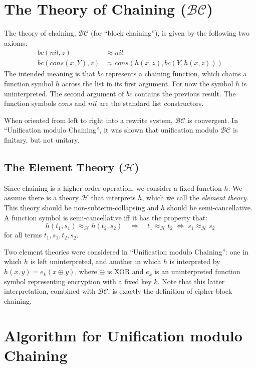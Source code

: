 \documentclass[11pt]{article}
\newcommand{\BC}{\mathcal{BC}}
\newcommand{\HH}{\mathcal{H}}
\newcommand{\Bc}{\mathit{bc}}
\newcommand{\Hh}{\mathit{h}}
\newcommand{\Cons}{\mathit{cons}}
\newcommand{\Nil}{\mathit{nil}}
\begin{document}
\section{The Theory of Chaining (\texorpdfstring{$\BC$}{BC})}
\label{section:theory}

The theory of chaining, $\BC$ (for ``block chaining''), is given by the
following two axioms:
\begin{align*}
    \Bc(\Nil, z) &\approx \Nil \\
    \Bc(\Cons(x, Y), z) &\approx \Cons(\Hh(x, z), \Bc(Y, \Hh(x, z)))
\end{align*}
The intended meaning is that $\Bc$ represents a chaining function, which chains
a function symbol $\Hh$ across the list in its first argument. For now the
symbol $\Hh$ is uninterpreted. The second argument of $\Bc$ contains the
previous result. The function symbols $\Cons$ and $\Nil$ are the standard list
constructors.

When oriented from left to right into a rewrite system, $\BC$ is convergent.
In ``Unification modulo Chaining'', it was shown that unification modulo $\BC$
is finitary, but not unitary.

\subsection{The Element Theory (\texorpdfstring{$\HH$}{H})}
\label{subsection:element-theory}

Since chaining is a higher-order operation, we consider a fixed function $\Hh$.
We assume there is a theory $\HH$ that interprets $\Hh$, which we call the
\emph{element theory}. This theory should be non-subterm-collapsing and
$\Hh$ should be semi-cancellative. A function symbol is semi-cancellative iff
it has the property that:
\[ \Hh(t_1, s_1) \approx_\HH^{} \Hh(t_2, s_2) \quad \Rightarrow \quad
t_1 \approx_\HH^{} t_2 \; \Leftrightarrow \; s_1 \approx_\HH^{} s_2 \]
for all terms $t_1, s_1, t_2, s_2$.

Two element theories were considered in ``Unification modulo Chaining'': one in
which $\Hh$ is left uninterpreted, and another in which $\Hh$ is interpreted by
$\Hh(x, y) = e_k(x \oplus y)$, where $\oplus$ is XOR and $e_k$ is an
uninterpreted function symbol representing encryption with a fixed key $k$.
Note that this latter interpretation, combined with $\BC$, is exactly the
definition of cipher block chaining.

\section{Algorithm for Unification modulo Chaining}\label{section:algorithm}
\end{document}
